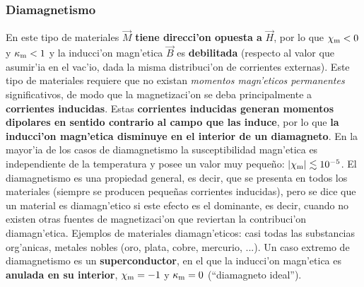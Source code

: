 \subsubsection{Diamagnetismo}
En este tipo de materiales $\vec{M}$ \textbf{tiene direcci'on opuesta a}  $\vec{H}$, por lo que $\chi_{\rm m}<0$ y $\kappa_{\rm m}<1$ y la inducci'on magn'etica $\vec{B}$ es \textbf{debilitada} (respecto al valor que asumir'ia en el vac'io, dada la misma distribuci'on de corrientes externas). Este tipo de materiales requiere que no existan \textit{momentos magn'eticos permanentes} significativos, de modo que la magnetizaci'on se deba principalmente a \textbf{corrientes inducidas}. Estas \textbf{corrientes inducidas generan momentos dipolares en sentido contrario al campo que las induce}, por lo que \textbf{la inducci'on magn'etica disminuye en el interior de un diamagneto}. En la mayor'ia de los casos de diamagnetismo la susceptibilidad magn'etica es independiente de la
temperatura y posee un valor muy peque\~no: $|\chi_{\rm m}|\lesssim 10^{-5}$. El
diamagnetismo es una propiedad general, es decir, que se presenta en todos los
materiales (siempre se producen peque\~nas corrientes inducidas), pero se dice
que un material es diamagn'etico si este efecto es el dominante, es decir,
cuando no existen otras fuentes de magnetizaci'on que reviertan la contribuci'on diamagn'etica.
Ejemplos de materiales diamagn'eticos: casi todas las substancias org'anicas,
metales nobles (oro, plata, cobre, mercurio, ...). Un caso extremo de
diamagnetismo es un \textbf{superconductor}, en el que la inducci'on magn'etica
es \textbf{anulada en su interior}, $\chi_{\rm m}=-1$ y $\kappa_{\rm m}=0$ (``diamagneto ideal'').

